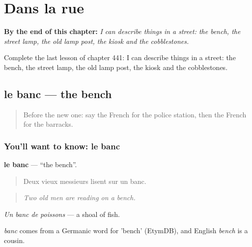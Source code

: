 
\chapter{Dans la rue}
\label{ch:fr-dans-la-rue}

\begin{chapteropening}
\textbf{By the end of this chapter:} \emph{I can describe things in a street: the bench, the street lamp, the old lamp post, the kiosk and the cobblestones.}

Complete the last lesson of chapter 441: I can describe things in a street: the bench, the street lamp, the old lamp post, the kiosk and the cobblestones.
\end{chapteropening}

\section[le banc]{le banc — the bench}

\label{lesson:FR-C441-banc}



\begin{quote}
Before the new one: say the French for the police station, then the French for the barracks.
\end{quote}

\subsection*{You'll want to know: le banc}
\textbf{le banc} — \textquotedblleft{}the bench\textquotedblright{}.

\begin{quote}
Deux vieux messieurs lisent sur un banc.
\end{quote}

\begin{quote}
\emph{Two old men are reading on a bench.}
\end{quote}

\emph{Un banc de poissons} — a shoal of fish.

\begin{cousinweb}
\emph{banc} comes from a Germanic word for 'bench' (EtymDB), and English \emph{bench} is a cousin.
\end{cousinweb}

